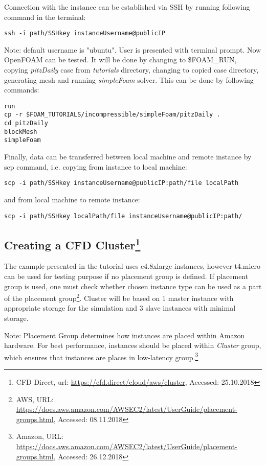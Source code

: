\documentclass[11pt,english]{article}
\begin{document}
Connection with the instance can be established via SSH by running following command in the terminal:
\begin{lstlisting}
ssh -i path/SSHkey instanceUsername@publicIP
\end{lstlisting}	
Note: default username is "ubuntu".
User is presented with terminal prompt. Now OpenFOAM can be tested. It will be done by changing to \$FOAM\_RUN, copying \textit{pitzDaily} case from \textit{tutorials} directory, changing to copied case directory, generating mesh and running \textit{simpleFoam} solver. This can be done by following commands:
\begin{lstlisting}
run
cp -r $FOAM_TUTORIALS/incompressible/simpleFoam/pitzDaily .
cd pitzDaily
blockMesh
simpleFoam
\end{lstlisting}
Finally, data can be transferred between local machine and remote instance by scp command, i.e. copying from instance to local machine:
\begin{lstlisting}
scp -i path/SSHkey instanceUsername@publicIP:path/file localPath
\end{lstlisting}
and from local machine to remote instance:
\begin{lstlisting}
scp -i path/SSHkey localPath/file instanceUsername@publicIP:path/
\end{lstlisting}

\subsection{\texorpdfstring{\label{Creating a CFD Cluster}Creating a CFD Cluster\footnote{CFD Direct, url: \url{https://cfd.direct/cloud/aws/cluster}, Accessed: 25.10.2018}}{Creating a CFD Cluster}}

The example presented in the tutorial uses c4.8xlarge instances, however t4.micro can be used for testing purpose if no placement group is defined. If placement group is used, one must check whether chosen instance type can be used as a part of the placement group\footnote{AWS, URL: \url{https://docs.aws.amazon.com/AWSEC2/latest/UserGuide/placement-groups.html}, Accessed: 08.11.2018}. Cluster will be based on 1 master instance with appropriate storage for the simulation and 3 slave instances with minimal storage.

Note: Placement Group determines how instances are placed within Amazon hardware. For best performance, instances should be placed within \textit{Cluster} group, which ensures that instances are places in low-latency group.\footnote{Amazon, URL: \url{https://docs.aws.amazon.com/AWSEC2/latest/UserGuide/placement-groups.html}, Accessed: 26.12.2018}
\end{document}
